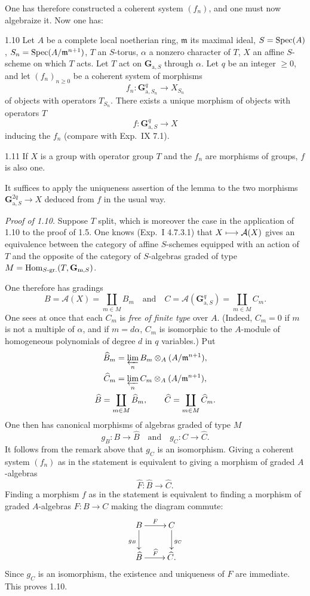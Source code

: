 One has therefore constructed a coherent system $(f_n)$, and one must now algebraize it. Now one has:
\begin{lemma}{1.10}\label{XX.1.10}
Let $A$ be a complete local noetherian ring, $\mathfrak m$ its maximal ideal, $S=\operatorname{Spec}(A)$, $S_n=\operatorname{Spec}(A/\mathfrak m^{n+1})$, $T$ an $S$-torus, $\alpha$ a nonzero character of $T$, $X$ an affine $S$-scheme on which $T$ acts. Let $T$ act on $\mathbf G_{\mathrm a,S}$ through $\alpha$. Let $q$ be an integer $\geq0$, and let $(f_n)_{n\geq0}$ be a coherent system of morphisms
\[
f_n:\mathbf G_{\mathrm a,S_n}^q\to X_{S_n}
\]
of objects with operators $T_{S_n}$. There exists a unique morphism of objects with operators $T$
\[
f:\mathbf G_{\mathrm a,S}^q\to X
\]
inducing the $f_n$ (compare with Exp.~IX 7.1).
\end{lemma}

\begin{corollary}{1.11}\label{XX.1.11}
If $X$ is a group with operator group $T$ and the $f_n$ are morphisms of groups, $f$ is also one.
\end{corollary}
It suffices to apply the uniqueness assertion of the lemma to the two morphisms $\mathbf G_{\mathrm a,S}^{2q}\to X$ deduced from $f$ in the usual way.

\emph{Proof of 1.10.} Suppose $T$ split, which is moreover the case in the application of 1.10 to the proof of 1.5. One knows (Exp.~I 4.7.3.1) that $X\longmapsto\mathcal A(X)$ gives an equivalence between the category of affine $S$-schemes equipped with an action of $T$ and the opposite of the category of $S$-algebras graded of type $M=\operatorname{Hom}_{S\text{-gr.}}(T,\mathbf G_{\mathrm m,S})$.

One therefore has gradings
\[
B=\mathcal A(X)=\coprod_{m\in M}B_m\quad\text{and}\quad
C=\mathcal A(\mathbf G_{\mathrm a,S}^q)=\coprod_{m\in M}C_m.
\]
One sees at once that each $C_m$ is \emph{free of finite type} over $A$. (Indeed, $C_m=0$ if $m$ is not a multiple of $\alpha$, and if $m=d\alpha$, $C_m$ is isomorphic to the $A$-module of homogeneous polynomials of degree $d$ in $q$ variables.) Put
\[
\begin{gathered}
\widehat B_m=\varprojlim_n B_m\otimes_A(A/\mathfrak m^{n+1}),\\
\widehat C_m=\varprojlim_n C_m\otimes_A(A/\mathfrak m^{n+1}),\\
\widehat B=\coprod_{m\in M}\widehat B_m,\qquad
\widehat C=\coprod_{m\in M}\widehat C_m.
\end{gathered}
\]
One then has canonical morphisms of algebras graded of type $M$
\[
g_B:B\to\widehat B\quad\text{and}\quad g_C:C\to\widehat C.
\]
It follows from the remark above that $g_C$ is an isomorphism. Giving a coherent system $(f_n)$ as in the statement is equivalent to giving a morphism of graded $A$-algebras
\[
\widehat F:\widehat B\to\widehat C.
\]
Finding a morphism $f$ as in the statement is equivalent to finding a morphism of graded $A$-algebras $F:B\to C$ making the diagram commute:
\[
\xymatrix{B\ar[r]^F\ar[d]_{g_B}&C\ar[d]^{g_C}\\
\widehat B\ar[r]^{\widehat F}&\widehat C.}
\]
Since $g_C$ is an isomorphism, the existence and uniqueness of $F$ are immediate. This proves 1.10.

